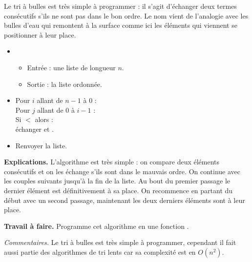 \documentclass[11pt,class=report,crop=false]{standalone}
\begin{document}
\begin{activite}
	
	
	
	Le tri à bulles est très simple à programmer : il s'agit d'échanger deux termes consécutifs s'ils ne sont pas dans le bon ordre. Le nom vient de l'analogie avec les bulles d'eau qui remontent à la surface comme ici les éléments qui viennent se positionner à leur place.
	
		\begin{algorithme}
		\sauteligne 
		
		\begin{itemize}
			\item 
			\begin{itemize}
				\item Entrée : une liste de longueur $n$.			
				\item Sortie : la liste ordonnée.				
			\end{itemize}
			
			\item Pour $i$ allant de $n-1$ à $0$ :\\
				\indentation Pour $j$ allant de $0$ à $i-1$ :\\
				\indentation\indentation Si  $<$  alors :\\
				\indentation\indentation\indentation échanger  et .
			
			
			\item Renvoyer la liste.
			
		\end{itemize}
	\end{algorithme} 

	\bigskip

\textbf{Explications.}
L'algorithme est très simple : on compare deux éléments consécutifs et on les échange s'ils sont dans le mauvais ordre.
On continue avec les couples suivants jusqu'à la fin de la liste. Au bout du premier passage le dernier élément est définitivement à sa place.
On recommence en partant du début avec un second passage, maintenant les deux derniers éléments sont à leur place. 


\bigskip

\textbf{Travail à faire.} Programme cet algorithme en une fonction .

\bigskip

\emph{Commentaires.} Le tri à bulles est très simple à programmer, cependant il fait aussi partie des algorithmes de 
tri lents car sa complexité est en $O(n^2)$.
	
\end{activite}
\end{document}
